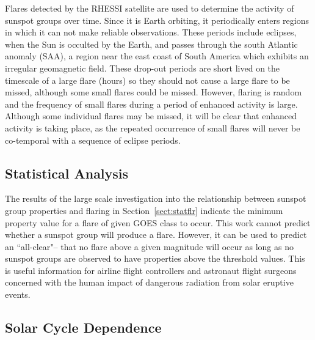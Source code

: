 {%

Flares detected by the \gls{RHESSI} satellite are used to determine the activity of sunspot groups over time. Since it is Earth orbiting, it periodically enters regions in which it can not make reliable observations. These periods include eclipses, when the Sun is occulted by the Earth, and passes through the south Atlantic anomaly (SAA), a region near the east coast of South America which exhibits an irregular geomagnetic field. These drop-out periods are short lived on the timescale of a large flare (hours) so they should not cause a large flare to be missed, although some small flares could be missed. However, flaring is random and the frequency of small flares during a period of enhanced activity is large. Although some individual flares may be missed, it will be clear that enhanced activity is taking place, as the repeated occurrence of small flares will never be co-temporal with a sequence of eclipse periods.

\subsection{Statistical Analysis}

The results of the large scale investigation into the relationship between sunspot group properties and flaring in Section~\ref{sect:statflr} indicate the minimum property value for a flare of given \gls{GOES} class to occur. This work cannot predict whether a sunspot group will produce a flare. However, it can be used to predict an ``all-clear"-- that no flare above a given magnitude will occur as long as no sunspot groups are observed to have properties above the threshold values. This is useful information for airline flight controllers and astronaut flight surgeons concerned with the human impact of dangerous radiation from solar eruptive events.

\subsection{Solar Cycle Dependence}

}
